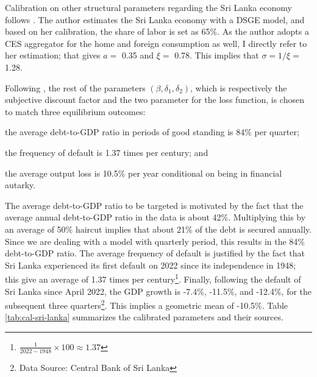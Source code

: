 Calibration on other structural parameters regarding the Sri Lanka economy follows \citet*{Jegajeevan-Sri-Lanka-DSGE}. The author estimates the Sri Lanka economy with a DSGE model, and based on her calibration, the share of labor is set as 65\%. As the author adopts a CES aggregator for the home and foreign consumption as well, I directly refer to her estimation; that gives $a =$ 0.35 and $\xi=$ 0.78\footnotemark{}.
This implies that $\sigma = 1/\xi = $ 1.28.


Following \citet{Na-18}, the rest of the parameters $\left( \beta, \delta_1, \delta_2 \right)$, which is respectively the subjective discount factor and the two parameter for the loss function, is chosen to match three equilibrium outcomes:
\begin{enumerate*}[label = (\roman*)]
    \item the average debt-to-GDP ratio in periods of good standing is 84\% per quarter;
    \item the frequency of default is 1.37 times per century; and
    \item the average output loss is 10.5\% per year conditional on being in financial autarky.
\end{enumerate*}
The average debt-to-GDP ratio to be targeted is motivated by the fact that the average annual debt-to-GDP ratio in the data is about 42\%\footnotemark{}.
Multiplying this by an average of 50\% haircut implies that about 21\% of the debt is secured annually\footnotemark{}.
Since we are dealing with a model with quarterly period, this results in the 84\% debt-to-GDP ratio.
The average frequency of default is justified by the fact that Sri Lanka experienced its first default on 2022 since its independence in 1948; this give an average of 1.37 times per century\footnote{$\frac{1}{2022-1948} \times 100 \approx 1.37$}. Finally, following the default of Sri Lanka since April 2022, the GDP growth is -7.4\%, -11.5\%, and -12.4\%, for the subsequent three quarters\footnote{Data Source: Central Bank of Sri Lanka}. This implies a geometric mean of -10.5\%.
Table \ref{tab:cal-sri-lanka} summarizes the calibrated parameters and their sources.

